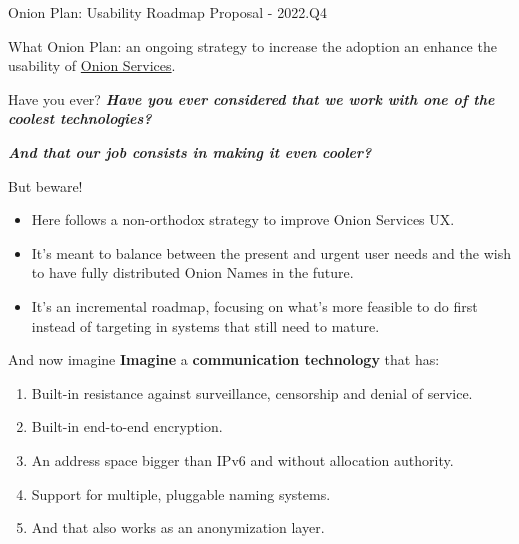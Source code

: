 \documentclass[
  ignorenonframetext,
]{beamer}
\author{}
\date{}
\providecommand{\tightlist}{%
  \setlength{\itemsep}{0pt}\setlength{\parskip}{0pt}}
\begin{document}
\begin{frame}{Onion Plan: Usability Roadmap Proposal - 2022.Q4}
\protect\hypertarget{onion-plan-usability-roadmap-proposal---2022.q4}{}
\end{frame}

\begin{frame}{What}
\protect\hypertarget{what}{}
Onion Plan: an ongoing strategy to increase the adoption an enhance the
usability of
\href{https://community.torproject.org/onion-services/}{Onion Services}.
\end{frame}

\begin{frame}{Have you ever?}
\protect\hypertarget{have-you-ever}{}
\textbf{\emph{Have you ever considered that we work with one of the
coolest technologies?}}

\textbf{\emph{And that our job consists in making it even cooler?}}
\end{frame}

\begin{frame}{But beware!}
\protect\hypertarget{but-beware}{}
\begin{itemize}
\tightlist
\item
  Here follows a non-orthodox strategy to improve Onion Services UX.
\item
  It's meant to balance between the present and urgent user needs and
  the wish to have fully distributed Onion Names in the future.
\item
  It's an incremental roadmap, focusing on what's more feasible to do
  first instead of targeting in systems that still need to mature.
\end{itemize}
\end{frame}

\begin{frame}{And now imagine}
\protect\hypertarget{and-now-imagine}{}
\textbf{Imagine} a \textbf{communication technology} that has:

\begin{enumerate}
\tightlist
\item
  Built-in resistance against surveillance, censorship and denial of
  service.
\item
  Built-in end-to-end encryption.
\item
  An address space bigger than IPv6 and without allocation authority.
\item
  Support for multiple, pluggable naming systems.
\item
  And that also works as an anonymization layer.
\end{enumerate}
\end{frame}
\end{document}
